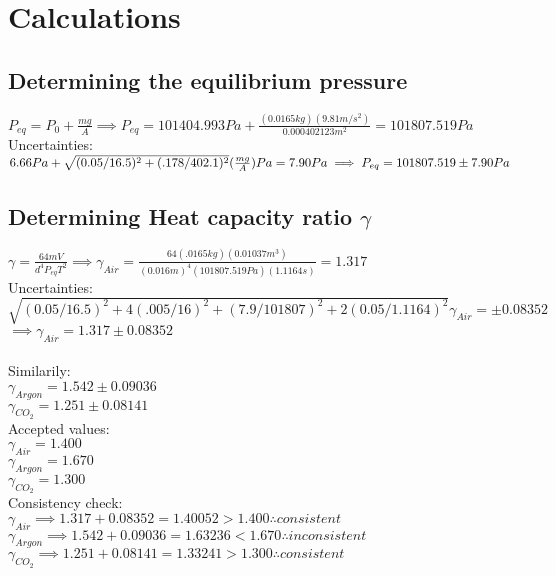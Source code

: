 \documentclass{article}
\begin{document}

\section{Calculations}
\subsection{Determining the equilibrium pressure}

$P_{eq}=P_0+\frac{mg}{A}  \implies P_{eq}=101404.993Pa+\frac{(0.0165kg)(9.81m/s^2)}{0.000402123m^2} = 101807.519Pa$\\ 

Uncertainties:\\
$6.66Pa + \sqrt{(0.05/16.5)^2+(.178/402.1)^2}(\frac{mg}{A})Pa = 7.90Pa\\
 \implies P_{eq} = 101807.519 \pm 7.90 Pa$

\subsection{Determining Heat capacity ratio $\gamma$}

$\gamma = \frac{64mV}{d^4P_{eq}T^2} \implies \gamma_{Air} = \frac{64(.0165kg)(0.01037m^3)}{(0.016m)^4(101807.519Pa)(1.1164s)} = 1.317$\\

Uncertainties:\\
$\sqrt{(0.05/16.5)^2+4(.005/16)^2+(7.9/101807)^2+2(0.05/1.1164)^2}\gamma_{Air} = \pm 0.08352$\\
$\implies \gamma_{Air} = 1.317 \pm 0.08352$\\\\
Similarily:\\
$\gamma_{Argon} = 1.542 \pm 0.09036 $\\
$\gamma_{CO_2} = 1.251 \pm 0.08141$\\

Accepted values:\\
$\gamma_{Air} = 1.400$\\
$\gamma_{Argon} = 1.670$\\
$\gamma_{CO_2} = 1.300$\\

Consistency check:\\
$\gamma_{Air} \implies 1.317 + 0.08352 = 1.40052 > 1.400 \therefore consistent$\\
$\gamma_{Argon} \implies 1.542 + 0.09036 = 1.63236 < 1.670 \therefore inconsistent$\\
$\gamma_{CO_2} \implies 1.251 + 0.08141 = 1.33241 > 1.300 \therefore consistent$\\
\end{document}
